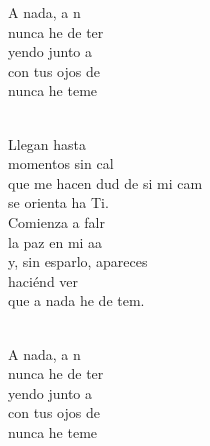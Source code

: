 \begin{cancion}
	\begin{chorus}%
	A nada, a n  \\
	nunca he de ter\\
	yendo junto a \\
	con tus ojos de \\
	nunca he  teme\\
	\end{chorus}%
	\jump\\
	Llegan hasta   \\
	momentos sin cal  \\
	que me hacen dud de si mi cam\\
	se orienta ha Ti.\\
	Comienza a falr \\
	la paz en mi aa \\
	y, sin esparlo, apareces \\
	haciénd ver\\
	que a nada he de tem.\\\jump\\
	\begin{chorus}%
	A nada, a n  \\
	nunca he de ter\\
	yendo junto a \\
	con tus ojos de \\
	nunca he  teme\\
	\end{chorus}%
	\jump\\
\end{cancion}%
